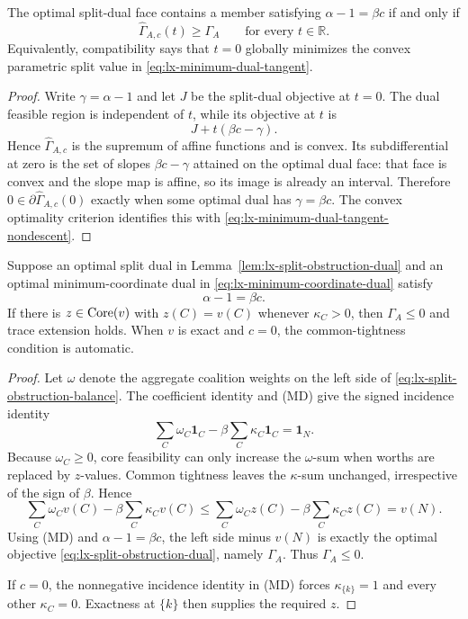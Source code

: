 \begin{proposition}
\label{prop:lx-minimum-dual-tangent}
The optimal split-dual face contains a member satisfying
$\alpha-1=\beta c$ if and only if
\[
 \widehat\Gamma_{A,c}(t)\geq\Gamma_A
 \qquad\text{for every }t\in\mathbb R.       \tag{TN}
 \label{eq:lx-minimum-dual-tangent-nondescent}
\]
Equivalently, compatibility says that $t=0$ globally minimizes the convex
parametric split value in \eqref{eq:lx-minimum-dual-tangent}.
\end{proposition}

\begin{proof}
Write $\gamma=\alpha-1$ and let $J$ be the split-dual objective at $t=0$.
The dual feasible region is independent of $t$, while its objective at $t$ is
\[
 J+t(\beta c-\gamma).
\]
Hence $\widehat\Gamma_{A,c}$ is the supremum of affine functions and is
convex.  Its subdifferential at zero is the set of slopes
$\beta c-\gamma$ attained on the optimal dual face: that face is convex and
the slope map is affine, so its image is already an interval.  Therefore
$0\in\partial\widehat\Gamma_{A,c}(0)$ exactly when some optimal dual has
$\gamma=\beta c$.  The convex optimality criterion identifies this with
\eqref{eq:lx-minimum-dual-tangent-nondescent}.
\end{proof}

\begin{proposition}
\label{prop:lx-compatible-minimum-cover}
Suppose an optimal split dual in
Lemma~\ref{lem:lx-split-obstruction-dual} and an optimal minimum-coordinate
dual in \eqref{eq:lx-minimum-coordinate-dual} satisfy
\[
 \alpha-1=\beta c.
\]
If there is $z\in\operatorname{Core}(v)$ with $z(C)=v(C)$ whenever $\kappa_C>0$, then
$\Gamma_A\leq0$ and trace extension holds.  When $v$ is exact and $c=0$, the
common-tightness condition is automatic.
\end{proposition}

\begin{proof}
Let $\omega$ denote the aggregate coalition weights on the left side of
\eqref{eq:lx-split-obstruction-balance}.  The coefficient identity and (MD)
give the signed incidence identity
\[
 \sum_C\omega_C\mathbf1_C-
 \beta\sum_C\kappa_C\mathbf1_C=\mathbf1_N.
\]
Because $\omega_C\geq0$, core feasibility can only increase the $\omega$-sum
when worths are replaced by $z$-values.  Common tightness leaves the
$\kappa$-sum unchanged, irrespective of the sign of $\beta$.  Hence
\[
 \sum_C\omega_Cv(C)-\beta\sum_C\kappa_Cv(C)
 \leq
 \sum_C\omega_Cz(C)-\beta\sum_C\kappa_Cz(C)=v(N).
\]
Using (MD) and $\alpha-1=\beta c$, the left side minus $v(N)$ is exactly the
optimal objective \eqref{eq:lx-split-obstruction-dual}, namely $\Gamma_A$.
Thus $\Gamma_A\leq0$.

If $c=0$, the nonnegative incidence identity in (MD) forces
$\kappa_{\{k\}}=1$ and every other $\kappa_C=0$.  Exactness at $\{k\}$ then
supplies the required $z$.
\end{proof}

